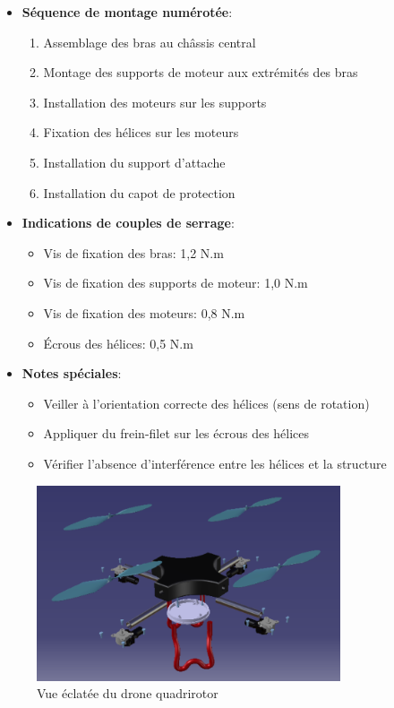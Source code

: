 \documentclass[a4paper,12pt]{report}
\begin{document}
\begin{itemize}
    \item \textbf{Séquence de montage numérotée}:
    \begin{enumerate}
        \item Assemblage des bras au châssis central
        \item Montage des supports de moteur aux extrémités des bras
        \item Installation des moteurs sur les supports
        \item Fixation des hélices sur les moteurs
        \item Installation du support d'attache
        \item Installation du capot de protection
    \end{enumerate}
    
    \item \textbf{Indications de couples de serrage}:
    \begin{itemize}
        \item Vis de fixation des bras: 1,2 N.m
        \item Vis de fixation des supports de moteur: 1,0 N.m
        \item Vis de fixation des moteurs: 0,8 N.m
        \item Écrous des hélices: 0,5 N.m
    \end{itemize}
    
    \item \textbf{Notes spéciales}:
    \begin{itemize}
        \item Veiller à l'orientation correcte des hélices (sens de rotation)
        \item Appliquer du frein-filet sur les écrous des hélices
        \item Vérifier l'absence d'interférence entre les hélices et la structure
    \end{itemize}
\end{itemize}

\begin{figure}[H]
    \centering
    \includegraphics[width=0.8\textwidth]{images/vue_eclatee_drone.png}
    \caption{Vue éclatée du drone quadrirotor}
    \label{fig:vue_eclatee}
\end{figure}
\end{document}
